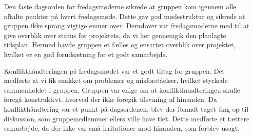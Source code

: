 Den faste dagsorden for fredagsmøderne sikrede at gruppen kom igennem alle aftalte punkter på hvert fredagsmøde. Dette gav god mødestruktur og sikrede at gruppen ikke sprang vigtige emner over. Derudover var fredagsmøderne med til at give overblik over status for projektets, da vi her gennemgik den planlagte tidsplan. Hermed havde gruppen et fælles og ensartet overblik over projektet, hvilket er en god forudsætning for et godt samarbejde. 

Konflikthåndteringen på fredagsmødet var et godt tiltag for gruppen. Det medførte at vi fik snakket om problemer og misforståelser, hvilket styrkede sammenholdet i gruppen. Gruppen var enige om at konflikthåndteringen skulle foregå konstruktivt, hvorved der ikke foregik tilsvining af hinanden. Da konflikthåndtering var et punkt på dagsordenen, blev der iblandt taget ting op til diskussion, som gruppemedlemmer ellers ville have tiet. Dette medførte et tættere samarbejde, da der ikke var små irritationer mod hinanden, som forblev usagt. 


